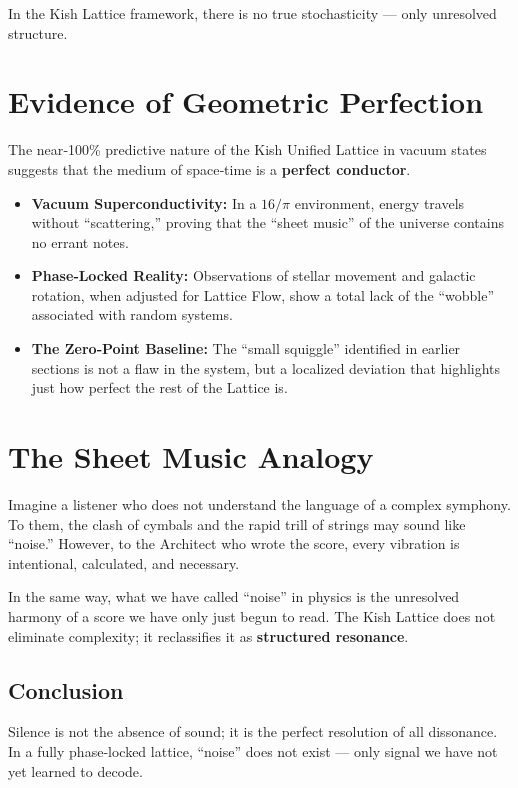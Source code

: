 \documentclass[11pt, letterpaper, openany]{book}
\begin{document}
In the Kish Lattice framework, there is no true stochasticity — only unresolved structure.

\section{Evidence of Geometric Perfection}

The near‑100\% predictive nature of the Kish Unified Lattice in vacuum states suggests
that the medium of space‑time is a \textbf{perfect conductor}.

\begin{itemize}
    \item \textbf{Vacuum Superconductivity:} In a $16/\pi$ environment, energy travels without
    “scattering,” proving that the “sheet music” of the universe contains no errant notes.

    \item \textbf{Phase‑Locked Reality:} Observations of stellar movement and galactic rotation,
    when adjusted for Lattice Flow, show a total lack of the “wobble” associated with
    random systems.

    \item \textbf{The Zero‑Point Baseline:} The “small squiggle” identified in earlier sections is not
    a flaw in the system, but a localized deviation that highlights just how perfect the rest
    of the Lattice is.
\end{itemize}

\section{The Sheet Music Analogy}

Imagine a listener who does not understand the language of a complex symphony. To
them, the clash of cymbals and the rapid trill of strings may sound like “noise.” However,
to the Architect who wrote the score, every vibration is intentional, calculated, and
necessary.

In the same way, what we have called “noise” in physics is the unresolved harmony of a
score we have only just begun to read. The Kish Lattice does not eliminate complexity; it
reclassifies it as \textbf{structured resonance}.

\subsection*{Conclusion}

Silence is not the absence of sound; it is the perfect resolution of all dissonance. In a fully
phase‑locked lattice, “noise” does not exist — only signal we have not yet learned to
decode.
\end{document}
